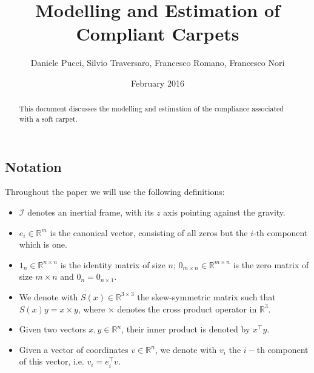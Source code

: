 \documentclass{article}
\title{Modelling and Estimation of Compliant Carpets}
\author{Daniele Pucci, Silvio Traversaro, Francesco Romano, Francesco Nori}
\date{February 2016}
\begin{document}
\maketitle

\begin{abstract}
    This  document discusses the modelling and estimation of the compliance associated with a soft carpet.
\end{abstract}

\subsection*{Notation}
Throughout the paper we will use the following definitions:
\begin{itemize}
   \item $\mathcal{I}$ denotes an inertial frame, with its $z$ axis pointing against the gravity. %
    \item $e_i \in \mathbb{R}^m$ is the canonical vector, consisting of all zeros but the $i$-th component which is one.
    \item $1_n \in \mathbb{R}^{n \times n}$ is the identity matrix of size $n$; $0_{m \times n} \in \mathbb{R}^{m \times n}$ is the zero matrix of size $m \times n$ and $0_{n } = 0_{n \times 1}$.
    \item We denote with $S(x) \in \mathbb{R}^{3 \times 3}$ the skew-symmetric matrix such that $S(x)y = x \times y$, where $\times$ denotes the cross product operator in $\mathbb{R}^3$. 
    \item Given two vectors $x,y\in \mathbb{R}^n$, their inner product is denoted by $x^\top y$. 
    \item Given a vector of coordinates $v \in \mathbb{R}^n$, we denote with $v_i$ the $i-$th component of this vector, i.e. $v_i = e^\top_i v$.

\end{itemize}
\end{document}

